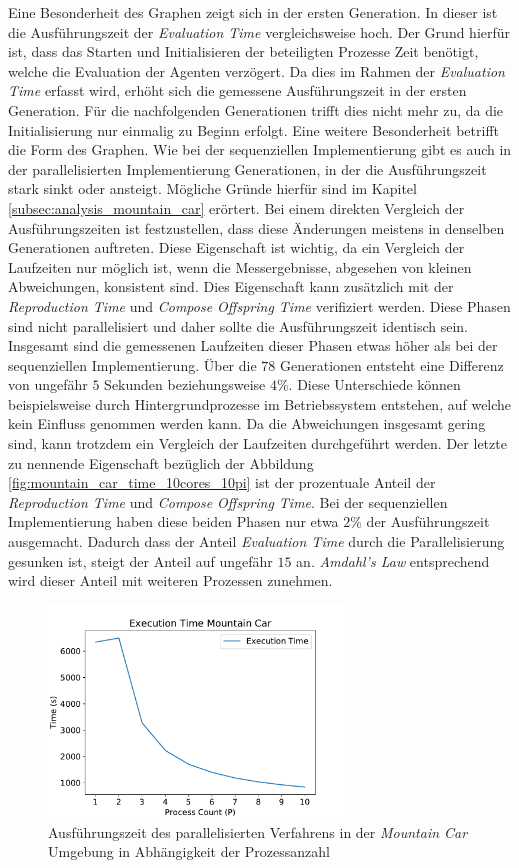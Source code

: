 Eine Besonderheit des Graphen zeigt sich in der ersten Generation. In dieser ist die Ausführungszeit der \emph{Evaluation Time} vergleichsweise hoch. Der Grund hierfür ist, dass das Starten und Initialisieren der beteiligten Prozesse Zeit benötigt, welche die Evaluation der Agenten verzögert. Da dies im Rahmen der \emph{Evaluation Time} erfasst wird, erhöht sich die gemessene Ausführungszeit in der ersten Generation. Für die nachfolgenden Generationen trifft dies nicht mehr zu, da die Initialisierung nur einmalig zu Beginn erfolgt. Eine weitere Besonderheit betrifft die Form des Graphen. Wie bei der sequenziellen Implementierung gibt es auch in der parallelisierten Implementierung Generationen, in der die Ausführungszeit stark sinkt oder ansteigt. Mögliche Gründe hierfür sind im Kapitel \ref{subsec:analysis_mountain_car} erörtert. Bei einem direkten Vergleich der Ausführungszeiten ist festzustellen, dass diese Änderungen meistens in denselben Generationen auftreten. Diese Eigenschaft ist wichtig, da ein Vergleich der Laufzeiten nur möglich ist, wenn die Messergebnisse, abgesehen von kleinen Abweichungen, konsistent sind. Dies Eigenschaft kann zusätzlich mit der \emph{Reproduction Time} und \emph{Compose Offspring Time} verifiziert werden. Diese Phasen sind nicht parallelisiert und daher sollte die Ausführungszeit identisch sein. Insgesamt sind die gemessenen Laufzeiten dieser Phasen etwas höher als bei der sequenziellen Implementierung. Über die $78$ Generationen entsteht eine Differenz von ungefähr $5$ Sekunden beziehungsweise $4\%$. Diese Unterschiede können beispielsweise durch Hintergrundprozesse im Betriebssystem entstehen, auf welche kein Einfluss genommen werden kann. Da die Abweichungen insgesamt gering sind, kann trotzdem ein Vergleich der Laufzeiten durchgeführt werden. Der letzte zu nennende Eigenschaft bezüglich der Abbildung \ref{fig:mountain_car_time_10cores_10pi} ist der prozentuale Anteil der \emph{Reproduction Time} und \emph{Compose Offspring Time}. Bei der sequenziellen Implementierung haben diese beiden Phasen nur etwa $2\%$ der Ausführungszeit ausgemacht. Dadurch dass der Anteil \emph{Evaluation Time} durch die Parallelisierung gesunken ist, steigt der Anteil auf ungefähr $15$ an. \emph{Amdahl's Law} entsprechend wird dieser Anteil mit weiteren Prozessen zunehmen.
\begin{figure}[!h]
	\centering
	\includegraphics[width=0.7\textwidth]{./img/mountain_car_analysis/time_mountain_car_1_10.pdf} 
	\caption{Ausführungszeit des parallelisierten Verfahrens in der \emph{Mountain Car} Umgebung in Abhängigkeit der Prozessanzahl}
	\label{fig:execution_time_mountain_car_1_10}
\end{figure}
